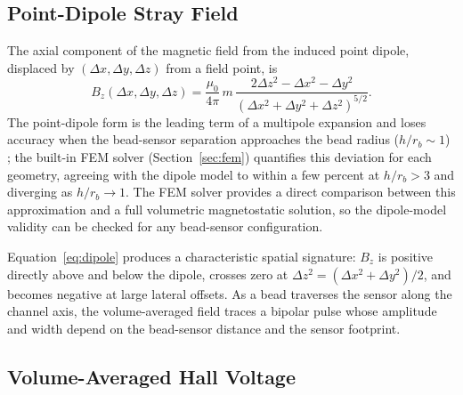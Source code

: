 \documentclass[micromachines,article,submit,pdftex,moreauthors]{Definitions/mdpi}
\begin{document}
\subsection{Point-Dipole Stray Field}
\label{sec:strayfield}

The axial component of the magnetic field from the induced point dipole, displaced
by $(\Delta x, \Delta y, \Delta z)$ from a field point, is \cite{griffiths}
\begin{equation}
B_z(\Delta x, \Delta y, \Delta z) = \frac{\mu_0}{4\pi} \, m \,
\frac{2\Delta z^2 - \Delta x^2 - \Delta y^2}
{\left(\Delta x^2 + \Delta y^2 + \Delta z^2\right)^{5/2}}.
\label{eq:dipole}
\end{equation}
The point-dipole form is the leading term of a multipole expansion and loses
accuracy when the bead-sensor separation approaches the bead radius
($h/r_b \sim 1$) \cite{griffiths}; the built-in FEM solver
(Section~\ref{sec:fem}) quantifies this deviation for each geometry, agreeing
with the dipole model to within a few percent at $h/r_b > 3$ and diverging as
$h/r_b \to 1$. The FEM solver provides a direct comparison between this
approximation and a full volumetric magnetostatic solution, so the dipole-model
validity can be checked for any bead-sensor configuration.

Equation~\eqref{eq:dipole} produces a characteristic spatial signature: $B_z$ is
positive directly above and below the dipole, crosses zero at
$\Delta z^2 = (\Delta x^2 + \Delta y^2)/2$, and becomes negative at large lateral
offsets. As a bead traverses the sensor along the channel axis, the volume-averaged
field traces a bipolar pulse whose amplitude and width depend on the bead-sensor
distance and the sensor footprint.

\subsection{Volume-Averaged Hall Voltage}
\label{sec:hallvoltage}
\end{document}
